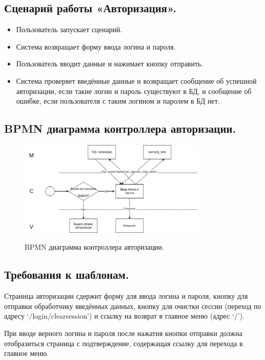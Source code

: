 \documentclass[12pt, a4paper]{article}
\begin{document}
	\subsection{Сценарий работы «Авторизация».}
	\begin{itemize}
		\item Пользователь запускает сценарий.
		\item Система возвращает форму ввода логина и пароля.
		\item Пользователь вводит данные и нажимает кнопку отправить.
		\item {Система проверяет введённые данные и возвращает сообщение об успешной
		       авторизации, если такие логин и пароль существуют в БД, и сообщение об ошибке,
	      	   если пользователя с таким логином и паролем в БД нет.}
	\end{itemize}

    \subsection{BPMN диаграмма контроллера авторизации.}
    \begin{figure}[h]
    	\centering    %
    	\includegraphics[width=0.8\textwidth]{pictures/authBPMN.png}
    	\label{fig:pic7} %
    	\caption{BPMN диаграмма контроллера авторизации.}
    \end{figure}

    \subsection{Требования к шаблонам.}
    Страница авторизации сдержит форму для ввода логина и пароля, кнопку для отправки
    обработчику введённых данных, кнопку для очистки сессии (переход по адресу ‘/login/clearsession’) и ссылку на возврат в главное меню (адрес ‘/’).
    
    При вводе верного логина и пароля после нажатия кнопки отправки должна отобразиться
    страница с подтверждение, содержащая ссылку для перехода в главное меню.
    
\end{document}
